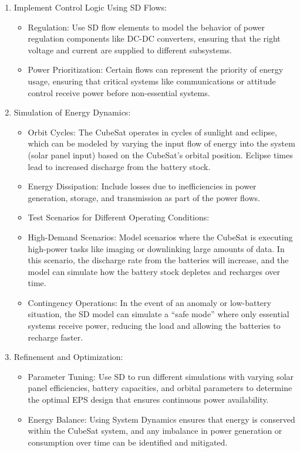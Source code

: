\documentclass[energies,accept,oneauthor,pdftex]{Definitions/mdpi}
\begin{document}
\begin{enumerate}
\item  Implement Control Logic Using SD Flows:
\begin{itemize}
\item  Regulation: Use SD flow elements to model the behavior of power regulation components like DC-DC converters, ensuring that the right voltage and current are supplied to different subsystems.
\item  Power Prioritization: Certain flows can represent the priority of energy usage, ensuring that critical systems like communications or attitude control receive power before non-essential systems.
\end{itemize}
\item  Simulation of Energy Dynamics:
\begin{itemize}
\item  Orbit Cycles: The CubeSat operates in cycles of sunlight and eclipse, which can be modeled by varying the input flow of energy into the system (solar panel input) based on the CubeSat's orbital position. Eclipse times lead to increased discharge from the battery stock.
\item  Energy Dissipation: Include losses due to inefficiencies in power generation, storage, and transmission as part of the power flows.
\item  Test Scenarios for Different Operating Conditions:
\end{itemize}
\begin{itemize}
\item  High-Demand Scenarios: Model scenarios where the CubeSat is executing high-power tasks like imaging or downlinking large amounts of data. In this scenario, the discharge rate from the batteries will increase, and the model can simulate how the battery stock depletes and recharges over time.
\item  Contingency Operations: In the event of an anomaly or low-battery situation, the SD model can simulate a ``safe mode'' where only essential systems receive power, reducing the load and allowing the batteries to recharge faster.
\end{itemize}
\item  Refinement and Optimization:
\begin{itemize}
\item  Parameter Tuning: Use SD to run different simulations with varying solar panel efficiencies, battery capacities, and orbital parameters to determine the optimal EPS design that ensures continuous power availability.
\item  Energy Balance: Using System Dynamics ensures that energy is conserved within the CubeSat system, and any imbalance in power generation or consumption over time can be identified and mitigated.
\end{itemize}
\end{enumerate}
\end{document}
